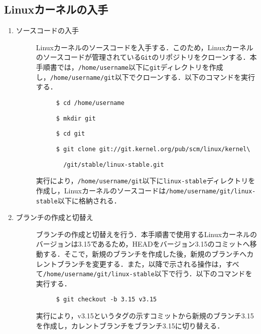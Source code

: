 \documentclass[12pt]{jsarticle}
\begin{document}
\subsection{Linuxカーネルの入手}
\begin{enumerate}
\item ソースコードの入手
  \begin{description}
  \item[] Linuxカーネルのソースコードを入手する．このため，Linuxカーネルのソースコードが管理されている\verb|Git|のリポジトリをクローンする．本手順書では，\verb|/home/username|以下に\verb|git|ディレクトリを作成し，\verb|/home/username/git|以下でクローンする．以下のコマンドを実行する．
    \begin{description}
    \item[] \verb|$ cd /home/username|
    \item[] \verb|$ mkdir git|
    \item[] \verb|$ cd git|
      \newpage
    \item[] \verb|$ git clone git://git.kernel.org/pub/scm/linux/kernel\|
    \item[] \verb|  /git/stable/linux-stable.git|
    \end{description}
  \item[] 実行により，\verb|/home/username/git|以下に\verb|linux-stable|ディレクトリを作成し，Linuxカーネルのソースコードは\verb|/home/username/git/linux-stable|以下に格納される．
  \end{description}
\item ブランチの作成と切替え
  \begin{description}
  \item[] ブランチの作成と切替えを行う．本手順書で使用するLinuxカーネルのバージョンは3.15であるため，HEADをバージョン3.15のコミットへ移動する．そこで，新規のブランチを作成した後，新規のブランチへカレントブランチを変更する．また，以降で示される操作は，すべて\verb|/home/username/git/linux-stable|以下で行う．以下のコマンドを実行する．
    \begin{description}
    \item[] \verb|$ git checkout -b 3.15 v3.15|
    \end{description}
  \item[] 実行により，v3.15というタグの示すコミットから新規のブランチ3.15を作成し，カレントブランチをブランチ3.15に切り替える．
  \end{description}
\end{enumerate}
\end{document}
